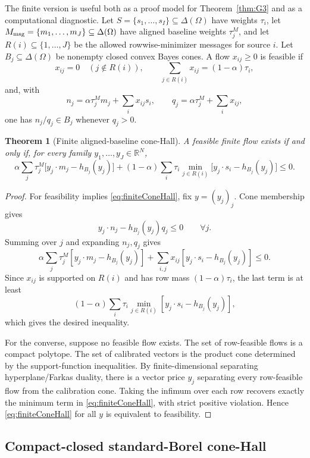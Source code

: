 \documentclass[11pt]{article}
\newtheorem{theorem}{Theorem}
\theoremstyle{definition}
\theoremstyle{remark}
\newcommand{\R}{\mathbb{R}}
\newcommand{\Om}{\Omega}
\begin{document}
The finite version is useful both as a proof model for Theorem~\ref{thm:G3} and as a computational diagnostic. Let $S=\{s_1,\ldots,s_I\}\subseteq\Delta(\Om)$ have weights $\tau_i$, let $M_{\rm msg}=\{m_1,\ldots,m_J\}\subseteq\Delta(\Om)$ have aligned baseline weights $\tau_j^M$, and let $R(i)\subseteq\{1,\ldots,J\}$ be the allowed rowwise-minimizer messages for source $i$. Let $B_j\subseteq\Delta(\Om)$ be nonempty closed convex Bayes cones. A flow $x_{ij}\ge0$ is feasible if
\[
  x_{ij}=0\quad(j\notin R(i)),
  \qquad
  \sum_{j\in R(i)}x_{ij}=(1-\alpha)\tau_i,
\]
and, with
\[
  n_j=\alpha\tau_j^M m_j+\sum_i x_{ij}s_i,
  \qquad
  q_j=\alpha\tau_j^M+\sum_i x_{ij},
\]
one has $n_j/q_j\in B_j$ whenever $q_j>0$.

\begin{theorem}[Finite aligned-baseline cone-Hall]\label{thm:G1}
A feasible finite flow exists if and only if, for every family $y_1,\ldots,y_J\in\R^N$,
\begin{equation}\label{eq:finiteConeHall}
  \alpha\sum_j\tau_j^M\big[y_j\cdot m_j-h_{B_j}(y_j)\big]
  +(1-\alpha)\sum_i\tau_i\min_{j\in R(i)}
       \big[y_j\cdot s_i-h_{B_j}(y_j)\big]
  \le 0.
\end{equation}
\end{theorem}

\begin{proof}
For feasibility implies \eqref{eq:finiteConeHall}, fix $y=(y_j)_j$. Cone membership gives
\[
  y_j\cdot n_j-h_{B_j}(y_j)q_j\le0
  \qquad\forall j.
\]
Summing over $j$ and expanding $n_j,q_j$ gives
\[
  \alpha\sum_j\tau_j^M[y_j\cdot m_j-h_{B_j}(y_j)]
  +\sum_{i,j}x_{ij}[y_j\cdot s_i-h_{B_j}(y_j)]\le0.
\]
Since $x_{ij}$ is supported on $R(i)$ and has row mass $(1-\alpha)\tau_i$, the last term is at least
\[
  (1-\alpha)\sum_i\tau_i\min_{j\in R(i)}[y_j\cdot s_i-h_{B_j}(y_j)],
\]
which gives the desired inequality.

For the converse, suppose no feasible flow exists. The set of row-feasible flows is a compact polytope. The set of calibrated vectors is the product cone determined by the support-function inequalities. By finite-dimensional separating hyperplane/Farkas duality, there is a vector price $y_j$ separating every row-feasible flow from the calibration cone. Taking the infimum over each row recovers exactly the minimum term in \eqref{eq:finiteConeHall}, with strict positive violation. Hence \eqref{eq:finiteConeHall} for all $y$ is equivalent to feasibility.
\end{proof}

\subsection{Compact-closed standard-Borel cone-Hall}\label{subsec:G2c}
\end{document}
